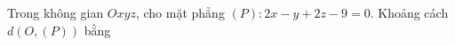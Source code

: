 \begin{ex}
Trong không gian $Oxyz$, cho mặt phẳng $(P)\colon 2x-y+2z-9=0$. Khoảng cách $d\left(O,(P)\right)$ bằng
\end{ex}

